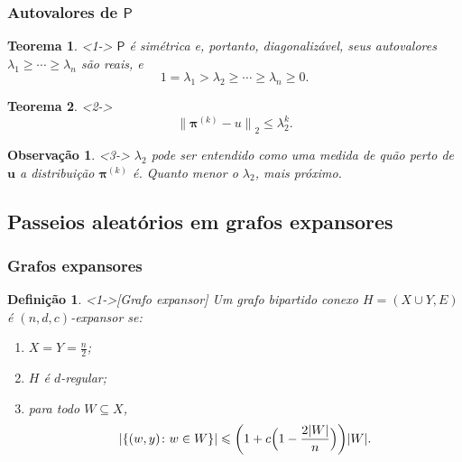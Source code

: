 \documentclass{beamer}
\def\MMp{\mathrm{.}} %
\def\geq{\geqslant} %
\def\leq{\leqslant} %
\def\chaves#1{\left\{ #1 \right\}} %
\def\cardi#1{\lvert #1 \rvert} %
\def\cjpp#1#2{\chaves{#1\colon#2}} %
\def\vetor#1{\boldsymbol{#1}}
\def\matriz#1{\mathsf{#1}}
\def\norma#1#2{{\lVert{#2}\rVert}_{#1}}
\theoremstyle{teoaxicorlem}
\newtheorem{Teo}{Teorema}
\theoremstyle{defnotnom}
\newtheorem{Def}{Definição}
\newtheorem{Obs}{Observação}
\begin{document}
\begin{frame}
  \frametitle{Autovalores de $\matriz P$}
  \begin{Teo}<1->
    $\matriz P$
    é simétrica e, portanto, diagonalizável, seus autovalores
    $\lambda_1\geq\dotsb\geq\lambda_n$ são reais, e
    \begin{equation*}
      1 = \lambda_1 > \lambda_2 \geq\dotsb\geq \lambda_n\geq 0\MMp
    \end{equation*}
  \end{Teo}
  \vfill
  \begin{Teo}<2->
    \begin{equation*}
      \norma2{{\vetor \pi}^{(k)}-u} \leq \lambda_2^k\MMp
    \end{equation*}
  \end{Teo}
  \vfill
  \begin{Obs}<3->
    $\lambda_2$ pode ser entendido como uma medida de quão perto de
    $\vetor u$ a distribuição ${\vetor{\pi}}^{(k)}$ é. Quanto menor o
    $\lambda_2$, mais próximo.
  \end{Obs}
\end{frame}

\subsection{Passeios aleatórios em grafos expansores}

\begin{frame}
  \frametitle{Grafos expansores}
  \begin{Def}<1->[Grafo expansor]
    Um grafo bipartido conexo
    $H=(X\cup Y, E)$ é \alert{$(n,d,c)$-\alert{expansor}} se:
    \begin{enumerate}
    \item $X=Y=\frac{n}2$;
    \item $H$ é $d$-regular;
    \item para todo $W\subseteq X$,
      \begin{equation*}
        \cardi{\cjpp{(w,y)}{w\in W}} \leq
        \biggl( 1 + c\Bigl(
          1 - \frac{2\cardi{W}}{n}
        \Bigr)\biggr)
        \cardi{W}\MMp
      \end{equation*}
    \end{enumerate}
  \end{Def}
\end{frame}
\end{document}
